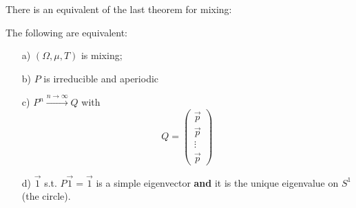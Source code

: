 There is an equivalent of the last theorem for mixing:
\begin{theorem}
    The following are equivalent:
    \begin{itemize}
        \item[a)] $(\Omega, \mu, T)$ is mixing;
        \item[b)] $P$ is irreducible and aperiodic
        \item[c)] $P^n \xrightarrow{n \rightarrow \infty} Q$ with 
        \begin{equation*}
            Q = 
            \begin{pmatrix}
                \Vec{p} \\
                \Vec{p} \\
                \vdots \\
                \Vec{p}
            \end{pmatrix}
        \end{equation*}
        \item[d)] $\Vec{1}$ s.t. $P \Vec{1} = \Vec{1}$ is a simple eigenvector \textbf{and} it is the unique eigenvalue on $S^1$ (the circle).
    \end{itemize}
\end{theorem}


